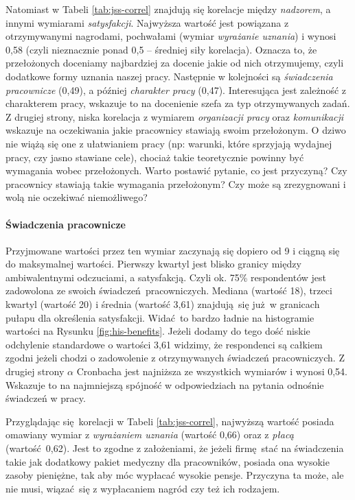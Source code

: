 Natomiast w Tabeli \ref{tab:jss-correl} znajdują się korelacje między \textit{nadzorem}, a innymi wymiarami \textit{satysfakcji}. Najwyższa wartość jest powiązana z otrzymywanymi nagrodami, pochwałami (wymiar \textit{wyrażanie uznania}) i wynosi 0,58 (czyli nieznacznie ponad 0,5 -- średniej siły korelacja). Oznacza to, że przełożonych doceniamy najbardziej za docenie jakie od nich otrzymujemy, czyli dodatkowe formy uznania naszej pracy. Następnie w kolejności są
\textit{świadczenia pracownicze} (0,49), a
później \textit{charakter pracy} (0,47). Interesująca jest zależność z charakterem pracy, wskazuje to na docenienie szefa za typ otrzymywanych zadań. Z drugiej strony, niska korelacja z wymiarem \textit{organizacji pracy} oraz \textit{komunikacji} wskazuje na oczekiwania jakie pracownicy stawiają swoim przełożonym. O dziwo nie wiążą się one z ułatwianiem pracy (np: warunki, które sprzyjają wydajnej pracy, czy jasno stawiane cele), chociaż takie teoretycznie powinny być
wymagania wobec przełożonych. Warto postawić pytanie, co jest przyczyną? Czy pracownicy stawiają takie wymagania przełożonym? Czy może są zrezygnowani i wolą nie oczekiwać niemożliwego?

\paragraph{Świadczenia pracownicze}\label{par:res-benefits} Przyjmowane wartości przez ten wymiar zaczynają się dopiero od 9 i ciągną się do maksymalnej wartości. Pierwszy kwartyl jest blisko granicy między ambiwalentnymi odczuciami, a satysfakcją. Czyli ok. 75\% respondentów jest zadowolona ze swoich świadczeń pracowniczych. Mediana (wartość 18), trzeci kwartyl (wartość 20) i średnia (wartość 3,61) znajdują się już w granicach pułapu dla określenia satysfakcji. Widać to bardzo ładnie na histogramie wartości na
Rysunku \ref{fig:his-benefits}. Jeżeli dodamy do tego dość niskie
odchylenie standardowe o wartości 3,61 widzimy, że respondenci są całkiem zgodni jeżeli chodzi o zadowolenie z otrzymywanych świadczeń pracowniczych. Z drugiej strony $\alpha$ Cronbacha jest najniższa ze wszystkich wymiarów i wynosi 0,54. Wskazuje to na najmniejszą spójność w odpowiedziach na pytania odnośnie świadczeń w pracy.

Przyglądając się korelacji w Tabeli \ref{tab:jss-correl}, najwyższą wartość posiada omawiany wymiar z \textit{wyrażaniem uznania} (wartość 0,66) oraz z \textit{płacą} (wartość 0,62). Jest to zgodne z założeniami, że jeżeli firmę stać na świadczenia takie jak dodatkowy pakiet medyczny dla pracowników, posiada ona wysokie zasoby pieniężne, tak aby móc wypłacać wysokie pensje. Przyczyna ta może, ale nie musi, wiązać się z wypłacaniem nagród czy też ich rodzajem. 

